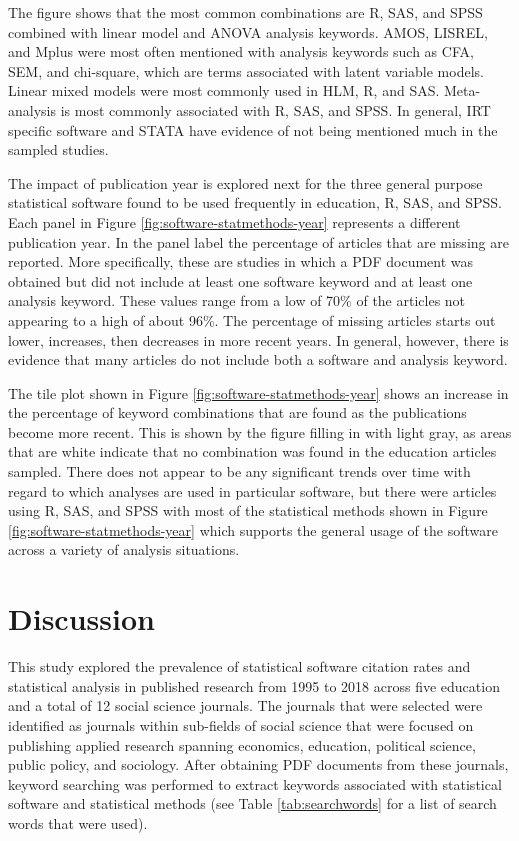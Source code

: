 \documentclass[
  english,
  ,man]{apa7}
\begin{document}
The figure shows that the most common combinations are R, SAS, and SPSS combined with linear model and ANOVA analysis keywords. AMOS, LISREL, and Mplus were most often mentioned with analysis keywords such as CFA, SEM, and chi-square, which are terms associated with latent variable models. Linear mixed models were most commonly used in HLM, R, and SAS. Meta-analysis is most commonly associated with R, SAS, and SPSS. In general, IRT specific software and STATA have evidence of not being mentioned much in the sampled studies.

The impact of publication year is explored next for the three general purpose statistical software found to be used frequently in education, R, SAS, and SPSS. Each panel in Figure \ref{fig:software-statmethods-year} represents a different publication year. In the panel label the percentage of articles that are missing are reported. More specifically, these are studies in which a PDF document was obtained but did not include at least one software keyword and at least one analysis keyword. These values range from a low of 70\% of the articles not appearing to a high of about 96\%. The percentage of missing articles starts out lower, increases, then decreases in more recent years. In general, however, there is evidence that many articles do not include both a software and analysis keyword.

The tile plot shown in Figure \ref{fig:software-statmethods-year} shows an increase in the percentage of keyword combinations that are found as the publications become more recent. This is shown by the figure filling in with light gray, as areas that are white indicate that no combination was found in the education articles sampled. There does not appear to be any significant trends over time with regard to which analyses are used in particular software, but there were articles using R, SAS, and SPSS with most of the statistical methods shown in Figure \ref{fig:software-statmethods-year} which supports the general usage of the software across a variety of analysis situations.

\hypertarget{discussion}{%
\section{Discussion}\label{discussion}}

This study explored the prevalence of statistical software citation rates and statistical analysis in published research from 1995 to 2018 across five education and a total of 12 social science journals. The journals that were selected were identified as journals within sub-fields of social science that were focused on publishing applied research spanning economics, education, political science, public policy, and sociology. After obtaining PDF documents from these journals, keyword searching was performed to extract keywords associated with statistical software and statistical methods (see Table \ref{tab:searchwords} for a list of search words that were used).
\end{document}

